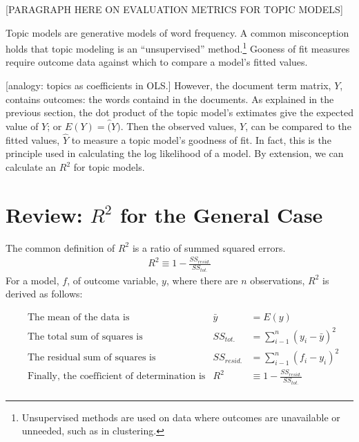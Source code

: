 \documentclass[12pt]{amsart}
\begin{document}

[PARAGRAPH HERE ON EVALUATION METRICS FOR TOPIC MODELS]

Topic models are generative models of word frequency. A common misconception holds that topic modeling is an ``unsupervised'' method.\footnote{Unsupervised methods are used on data where outcomes are unavailable or unneeded, such as in clustering.} Gooness of fit measures require outcome data against which to compare a model's fitted values. 

[analogy: topics as coefficients in OLS.] However, the document term matrix, $Y$, contains outcomes: the words containd in the documents. As explained in the previous section, the dot product of the topic model's extimates give the expected value of $Y$; or $E(Y) = \hat(Y)$. Then the observed values, $Y$, can be compared to the fitted values, $\hat{Y}$ to measure a topic model's goodness of fit. In fact, this is the principle used in calculating the log likelihood of a model. By extension, we can calculate an $R^2$ for topic models.



\section{Review: $R^2$ for the General Case}

The common definition of $R^2$ is a ratio of summed squared errors. 
\begin{align*}
    R^2 \equiv 1 - \frac{SS_{resid.}}{SS_{tot.}}
\end{align*} For a model, $f$, of outcome variable, $y$, where there are $n$ observations, $R^2$ is derived as follows:

\begin{align*}
	& \text{The mean of the data is} & \bar{y} &= E(y) \\ %
	& \text{The total sum of squares is} & SS_{tot.} &= \sum_{i-1}^n{(y_i-\bar{y})^2}\\
	& \text{The residual sum of squares is} & SS_{resid.} &= \sum_{i-1}^n{(f_i-y_i)^2}\\
	& \text{Finally, the coefficient of determination is} & R^2 &\equiv 1 - \frac{SS_{resid.}}{SS_{tot.}}\\
\end{align*}
\end{document}
